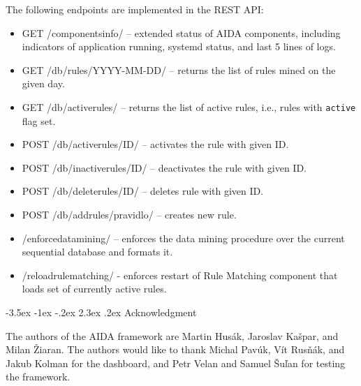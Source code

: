 \documentclass[a4paper]{article} %
\makeatletter
\renewcommand\section{\@startsection {section}{1}{\z@}%
                   {-3.5ex \@plus -1ex \@minus -.2ex}%
                   {2.3ex \@plus.2ex}%
                   {\normalfont\sffamily\Large\bfseries\color{projectcolor}}}
\renewcommand\subsection{\@startsection{subsection}{2}{\z@}%
                   {-3.25ex\@plus -1ex \@minus -.2ex}%
                   {1.5ex \@plus .2ex}%
                   {\normalfont\sffamily\large\bfseries\color{projectcolor}}}
\makeatother
\begin{document}
The following endpoints are implemented in the REST API:
\begin{itemize}[nolistsep,noitemsep]
  \item GET /componentsinfo/ -- extended status of AIDA components, including indicators of application running, systemd status, and last 5 lines of logs.
  \item GET /db/rules/YYYY-MM-DD/ -- returns the list of rules mined on the given day.
  \item GET /db/activerules/ -- returns the list of active rules, i.e., rules with \texttt{active} flag set.
  \item POST /db/activerules/ID/ -- activates the rule with given ID.
  \item POST /db/inactiverules/ID/ -- deactivates the rule with given ID.
  \item POST /db/deleterules/ID/ -- deletes rule with given ID.
  \item POST /db/addrules/pravidlo/ -- creates new rule.
  \item /enforcedatamining/ -- enforces the data mining procedure over the current sequential database and formats it.
  \item /reloadrulematching/ - enforces restart of Rule Matching component that loads set of currently active rules.
\end{itemize}


% 

% 

\cleardoublepage

\section{Acknowledgment}

The authors of the AIDA framework are Martin Hus\'{a}k, Jaroslav Ka\v{s}par, and Milan \v{Z}iaran. The authors would like to thank Michal Pav\'{u}k, V\'{i}t Rus\v{n}\'{a}k, and Jakub Kolman for the dashboard, and Petr Velan and Samuel \v{S}u\v{l}an for testing the framework.
\end{document}
